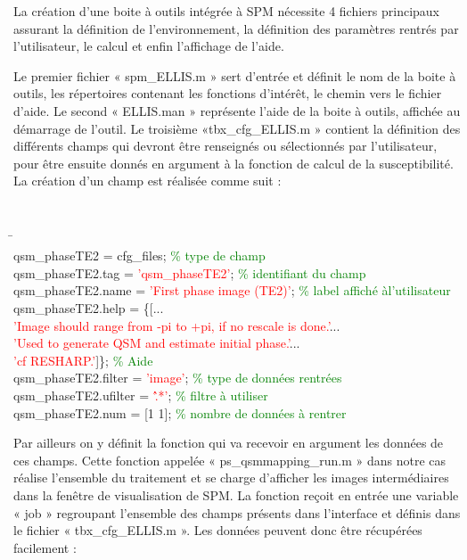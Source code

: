 {La création d’une boite à outils intégrée à SPM nécessite 4 fichiers principaux assurant la
définition de l’environnement, la définition des paramètres rentrés par l’utilisateur, le calcul et enfin
l’affichage de l’aide.

Le premier fichier « spm\_ELLIS.m » sert d’entrée et définit le nom de la boite à outils, les
répertoires contenant les fonctions d’intérêt, le chemin vers le fichier d’aide. Le second « ELLIS.man »
représente l’aide de la boite à outils, affichée au démarrage de l’outil. Le troisième «tbx\_cfg\_ELLIS.m »
contient la définition des différents champs qui devront être renseignés ou sélectionnés par
l’utilisateur, pour être ensuite donnés en argument à la fonction de calcul de la susceptibilité. La
création d’un champ est réalisée comme suit :

{\tt
\begin{tabbing}
\hspace{1cm}\=\hspace{1cm}\\
\> qsm\_phaseTE2 = cfg\_files; \textcolor{green}{\% type de champ}\\
\> qsm\_phaseTE2.tag = \textcolor{red}{'qsm\_phaseTE2'}; \textcolor{green}{\% identifiant du champ}\\
\> qsm\_phaseTE2.name = \textcolor{red}{'First phase image (TE2)'}; \textcolor{green}{\% label affiché àl'utilisateur}\\
\> qsm\_phaseTE2.help = \{[...\\
\> \textcolor{red}{'Image should range from -pi to +pi, if no rescale is done.'}...\\
\> \textcolor{red}{'Used to generate QSM and estimate initial phase.'}...\\
\> \textcolor{red}{'cf RESHARP.'}]\}; \textcolor{green}{\% Aide}\\
\> qsm\_phaseTE2.filter = \textcolor{red}{'image'}; \textcolor{green}{\% type de données rentrées}\\
\> qsm\_phaseTE2.ufilter = \textcolor{red}{'\^.*'}; \textcolor{green}{\% filtre à utiliser}\\
\> qsm\_phaseTE2.num = [1 1]; \textcolor{green}{\% nombre de données à rentrer}\vspace{0.5cm}\\
\end{tabbing}
}
Par ailleurs on y définit la fonction qui va recevoir en argument les données de ces champs.
Cette fonction appelée « ps\_qsmmapping\_run.m » dans notre cas réalise l’ensemble du traitement et
se charge d’afficher les images intermédiaires dans la fenêtre de visualisation de SPM. La fonction
reçoit en entrée une variable « job » regroupant l’ensemble des champs présents dans l’interface et
définis dans le fichier « tbx\_cfg\_ELLIS.m ». Les données peuvent donc être récupérées facilement :
 
}
